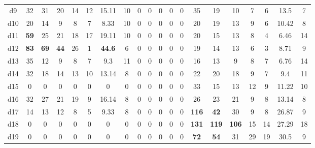 \begin{tabular*}{\linewidth}{ @{\extracolsep{\fill}}c | ccccccc | ccccc | ccccccc @{}}
d9 &  32 & 31  &  20  &  14  &  12 &  15.11  &  10 
     & 0 & 0  &  0  &  0  &  0   
    &  35 & 19  &  10  &  7  &  6 &  13.5  &  7  \\

d10 &  20 & 14  &  9  &  8  &  7 &  8.33  &  10 
     & 0 & 0  &  0  &  0  &  0   
    &  20 & 19  &  13  &  9  &  6 &  10.42  &  8  \\

d11 &  \textbf{{\color{red}59}} & 25 & 21  &  18  &  17 &  19.11  &  10 
     & 0 & 0  &  0  &  0  &  0   
    &  20 & 15  &  13  &  8  &  4 &  6.46  &  14  \\

d12 &  \textbf{{\color{red}83}}& \textbf{{\color{red}69}} & \textbf{{\color{red}44}}  &  26  & 1  & \textbf{{\color{red}44.6}}  &  6 
     & 0 & 0  &  0  &  0  &  0   
    &  19 & 14  & 13  &  6  &  3 &  8.71  &  9  \\

d13 &  35 & 12  &  9  & 8  & 7 &  9.3  &  11 
     & 0 & 0  &  0  &  0  &  0   
    &  16 & 13  &  9  &  8  & 7 &  6.76  &  14  \\

d14 &  32 & 18  &  14  &  13  &  10 &  13.14  &  8 
     & 0 & 0  &  0  &  0  &  0   
    &  22 & 20  &  18  &  9  & 7 &  9.4  &  11  \\

d15 &  0 & 0  &  0  &  0  &  0 &  0  &  0 
     & 0 & 0  &  0  &  0  &  0 
    &  33 & 15  &  13  &  12  &  9 & 11.22  &  10 \\

d16 & 32 & 27  &  21  &  19  &  9 &  16.14  &  8 
     & 0 & 0  &  0  &  0  &  0   
    &  26 & 23  &  21  &  9  & 8 &  13.14  &  8  \\

d17  & 14 & 13  &  12   & 8  &  5 &  9.33  &  8   
      & 0 & 0  &  0  &  0  &  0
      &  \textbf{{\color{red}116}} & \textbf{{\color{red}42}}  &  30  &  9  &  8 &  26.87  &  9\\

d18 &  0 & 0  &  0  &  0  &  0 &  0  &  0 
     & 0 & 0  &  0  &  0  &  0   
    &  \textbf{{\color{red}131}} & \textbf{{\color{red}119}}  &  \textbf{{\color{red}106}}  &  15  &  14 &  27.29  &  18  \\

d19 &  0 & 0  &  0  &  0  &  0 &  0  &  0 
     & 0 & 0  &  0  &  0  &  0   
    &  \textbf{{\color{red}72}} & \textbf{{\color{red}54}}  &  31  &  29  &  19 &  30.5  &  9  \\


\end{tabular*}
